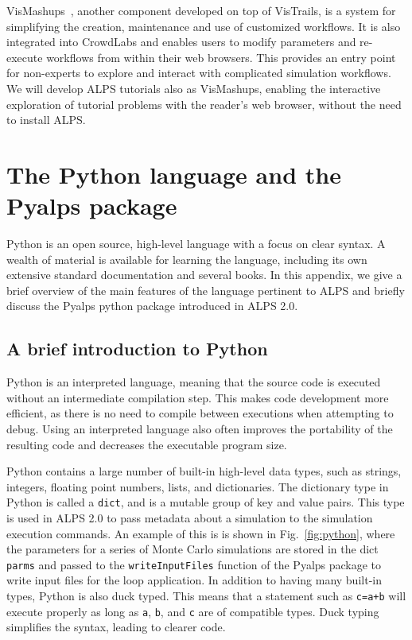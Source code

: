 \documentclass[12pt]{iopart}
\begin{document}
VisMashups~\cite{Santos09}, another component developed on top of VisTrails, is a system for simplifying the creation,
maintenance and use of customized workflows. It is also
integrated into CrowdLabs and enables users to modify parameters and
re-execute workflows from within their web browsers. This provides an
entry point for non-experts to explore and interact with complicated
simulation workflows. We will develop ALPS tutorials also as VisMashups, enabling the interactive exploration of tutorial problems with the reader's web browser, without the need to install ALPS.



\section{The Python language and the Pyalps package}

Python\cite{python} is an open source, high-level language with a focus on clear syntax.  A wealth of material is available for learning the language, including its own extensive standard documentation and several books\cite{LearningPython, ProgrammingPython}.  In this appendix, we give a brief overview of the main features of the language pertinent to ALPS and briefly discuss the Pyalps python package introduced in ALPS 2.0.

\subsection{A brief introduction to Python}
Python is an interpreted language, meaning that the source code is executed without an intermediate compilation step.  This makes code development more efficient, as there is no need to compile between executions when attempting to debug.  Using an interpreted language also often improves the portability of the resulting code and decreases the executable program size.

Python contains a large number of built-in high-level data types, such as strings, integers, floating point numbers, lists, and dictionaries.  The dictionary type in Python is called a {\tt dict}, and is a mutable group of key and value pairs.  This type is used in ALPS 2.0 to pass metadata about a simulation to the simulation execution commands.  An example of this is is shown in Fig.~\ref{fig:python}, where the parameters for a series of Monte Carlo simulations are stored in the dict {\tt parms} and passed to the {\tt writeInputFiles} function of the Pyalps package to write input files for the loop application.  In addition to having many built-in types, Python is also duck typed. This means that a statement such as {\tt c=a+b} will execute properly as long as {\tt a}, {\tt b}, and {\tt c} are of compatible types.  Duck typing simplifies the syntax, leading to clearer code.
\end{document}

